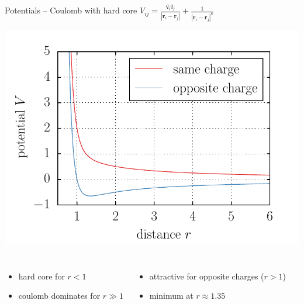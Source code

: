 \documentclass[mathserif,serif]{beamer}
\begin{document}
\begin{frame}{Potentials -- Coulomb with hard core}
	\centering
	$V_{ij} = \frac{q_i q_j}{| \mathbf{r}_i - \mathbf{r}_j |} + \frac{1}{| \mathbf{r}_i - \mathbf{r}_j |^8}$
	
	
	\includegraphics[height=0.5\textheight]{./figures/potential_coulomb.pdf}
	\begin{columns}
			\begin{itemize}
				\item hard core for $r < 1$
				\item coulomb dominates for $r \gg 1$
			\end{itemize}
			\begin{itemize}
				\item attractive for opposite charges ($r > 1$)
				\item minimum at $r\approx 1.35$
			\end{itemize}
	\end{columns}
	
\end{frame}
\end{document}
